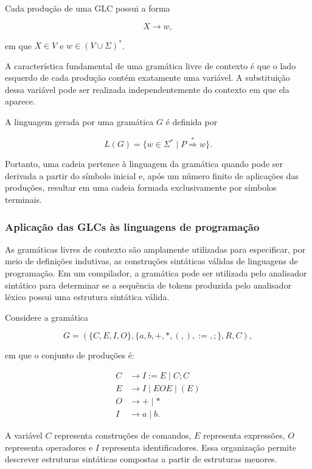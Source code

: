 \documentclass[
  brazilian,
  letterpaper,
]{book}
\theoremstyle{plain}
\theoremstyle{definition}
\theoremstyle{remark}
\begin{document}
Cada produção de uma GLC possui a forma

\[
X \rightarrow w,
\]

em que \(X \in V\) e \(w \in (V\cup\Sigma)^*\).

A característica fundamental de uma gramática livre de contexto é que o
lado esquerdo de cada produção contém exatamente uma variável. A
substituição dessa variável pode ser realizada independentemente do
contexto em que ela aparece.

A linguagem gerada por uma gramática \(G\) é definida por

\[
L(G)=\{w\in\Sigma^* \mid P\overset{*}{\Rightarrow}w\}.
\]

Portanto, uma cadeia pertence à linguagem da gramática quando pode ser
derivada a partir do símbolo inicial e, após um número finito de
aplicações das produções, resultar em uma cadeia formada exclusivamente
por símbolos terminais.

\subsubsection{Aplicação das GLCs às linguagens de
programação}\label{aplicauxe7uxe3o-das-glcs-uxe0s-linguagens-de-programauxe7uxe3o}

As gramáticas livres de contexto são amplamente utilizadas para
especificar, por meio de definições indutivas, as construções sintáticas
válidas de linguagens de programação. Em um compilador, a gramática pode
ser utilizada pelo analisador sintático para determinar se a sequência
de tokens produzida pelo analisador léxico possui uma estrutura
sintática válida.

Considere a gramática

\[
G=(\{C,E,I,O\},\{a,b,+,*,(,),:=,;\},R,C),
\]

em que o conjunto de produções é:

\[
\begin{aligned}
C &\rightarrow I:=E \mid C;C\\
E &\rightarrow I \mid EOE \mid (E)\\
O &\rightarrow + \mid *\\
I &\rightarrow a \mid b.
\end{aligned}
\]

A variável \(C\) representa construções de comandos, \(E\) representa
expressões, \(O\) representa operadores e \(I\) representa
identificadores. Essa organização permite descrever estruturas
sintáticas compostas a partir de estruturas menores.
\end{document}
